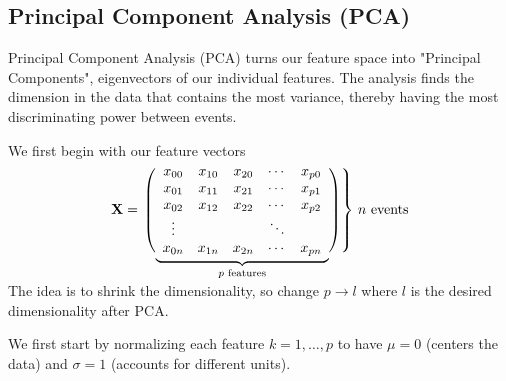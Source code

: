 \subsection{Principal Component Analysis (PCA)}
Principal Component Analysis (PCA) turns our feature space into "Principal Components", eigenvectors of our individual features. The analysis finds the dimension in the data that contains the most variance, thereby having the most discriminating power between events.

We first begin with our feature vectors
$$\mathbf{X} = \left.\left( 
                  \vphantom{\begin{array}{c}1\\1\\1\\1\\1\end{array}}
                  \smash{\underbrace{
                      \begin{array}{ccccc}
                             x_{00}&x_{10}&x_{20}&\cdots &x_{p0}\\
                             x_{01}&x_{11}&x_{21}&\cdots &x_{p1}\\
                             x_{02}&x_{12}&x_{22}&\cdots &x_{p2}\\
                             \vdots&&&\ddots&\\
                             x_{0n}&x_{1n}&x_{2n}&\cdots &x_{pn}
                      \end{array}
                      }_{p\text{ features}}}
              \right)\right\}
              \,n\text{ events}
$$\\

The idea is to shrink the dimensionality, so change $p\rightarrow l$ where $l$ is the desired dimensionality after PCA. 

We first start by normalizing each feature $k=1,\dots,p$ to have $\mu=0$ (centers the data) and $\sigma=1$ (accounts for different units).

